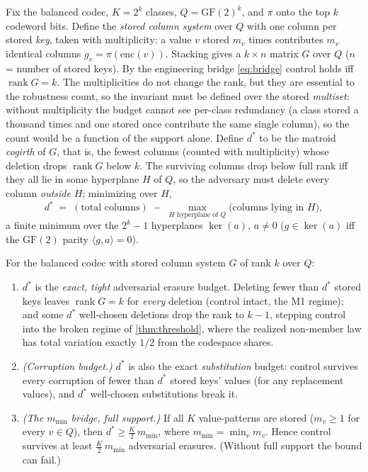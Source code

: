 \documentclass[sigconf,nonacm,anonymous,balance=false]{acmart}
\newcommand{\enc}{\mathrm{enc}}
\newcommand{\GF}{\mathrm{GF}(2)}
\DeclareMathOperator{\rank}{rank}
\newcommand{\proj}{\pi}                     %
\newcommand{\Quot}{Q}                       %
\begin{document}
Fix the balanced codec, $K = 2^k$ classes, $\Quot = \GF^k$, and $\proj$ onto the top $k$
codeword bits. Define the \emph{stored column system} over $\Quot$ with one column per
stored \emph{key}, taken with multiplicity: a value $v$ stored $m_v$ times contributes
$m_v$ identical columns $g_v = \proj(\enc(v))$. Stacking gives a $k \times n$ matrix $G$
over $\Quot$ ($n$ = number of stored keys). By the engineering bridge \eqref{eq:bridge}
control holds iff $\rank G = k$. The multiplicities do not change the rank, but they are
essential to the robustness count, so the invariant must be defined over the stored
\emph{multiset}: without multiplicity the budget cannot see per-class redundancy (a class
stored a thousand times and one stored once contribute the same single column), so the count
would be a function of the support alone. Define $d^\ast$ to be the matroid \emph{cogirth} of $G$, that is, the
fewest columns (counted with multiplicity) whose deletion drops $\rank G$ below $k$.
The surviving columns drop below full rank iff they all lie in some hyperplane $H$ of
$\Quot$, so the adversary must delete every column \emph{outside} $H$; minimizing over $H$,
\begin{equation}
  d^\ast \;=\; (\text{total columns}) \;-\; \max_{H \text{ hyperplane of } \Quot}
              \big(\text{columns lying in } H\big),
  \label{eq:cogirth}
\end{equation}
a finite minimum over the $2^k - 1$ hyperplanes $\ker(a)$, $a \ne 0$ ($g \in \ker(a)$ iff
the $\GF$ parity $\langle g, a\rangle = 0$).

\begin{theorem}
\label{thm:cogirth}
For the balanced codec with stored column system $G$ of rank $k$ over $\Quot$:
\begin{enumerate}
  \item $d^\ast$ is the \emph{exact, tight} adversarial erasure budget. Deleting fewer
  than $d^\ast$ stored keys leaves $\rank G = k$ for \emph{every} deletion (control intact,
  the M1 regime); and some $d^\ast$ well-chosen deletions drop the rank to $k-1$, stepping
  control into the broken regime of \cref{thm:threshold}, where the realized non-member law
  has total variation exactly $1/2$ from the codespace shares.
  \item \emph{(Corruption budget.)} $d^\ast$ is also the exact \emph{substitution} budget:
  control survives every corruption of fewer than $d^\ast$ stored keys' values (for any
  replacement values), and $d^\ast$ well-chosen substitutions break it.
  \item \emph{(The $m_{\min}$ bridge, full support.)} If all $K$ value-patterns are stored
  ($m_v \ge 1$ for every $v \in \Quot$), then $d^\ast \ge \tfrac{K}{2}\, m_{\min}$, where
  $m_{\min} = \min_v m_v$. Hence control survives at least $\tfrac{K}{2}\,m_{\min}$
  adversarial erasures. (Without full support the bound can fail.)
\end{enumerate}
\end{theorem}
\end{document}
